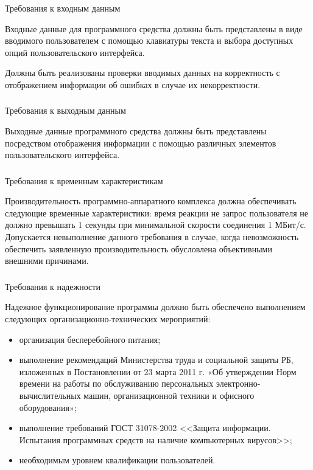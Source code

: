 \subsubsection{} Требования к входным данным
\label{sec:analysis:specification:inputs}

Входные данные для программного средства должны быть представлены в виде вводимого пользователем с помощью клавиатуры текста и выбора доступных опций пользовательского интерфейса.

Должны быть реализованы проверки вводимых данных на корректность с отображением информации об ошибках в случае их некорректности.

\subsubsection{} Требования к выходным данным
\label{sec:analysis:specification:outputs}

Выходные данные программного средства должны быть представлены посредством отображения информации с помощью различных элементов пользовательского интерфейса.

\subsubsection{} Требования к временным характеристикам
\label{sec:analysis:specification:timing}

Производительность программно-аппаратного комплекса должна обеспечивать следующие временные характеристики: время реакции не запрос пользователя не должно превышать 1 секунды при минимальной скорости соединения 1 МБит/с. Допускается невыполнение данного требования в случае, когда невозможность обеспечить заявленную производительность обусловлена объективными внешними причинами.

\subsubsection{} Требования к надежности
\label{sec:analysis:specification:reliability}

Надежное функционирование программы должно быть обеспечено выполнением следующих организационно-технических мероприятий:

\begin{itemize}
	\item организация бесперебойного питания;
	\item выполнение рекомендаций Министерства труда и социальной защиты РБ, изложенных в Постановлении от 23 марта 2011 г. «Об утверждении Норм времени на работы по обслуживанию персональных электронно-вычислитель\-ных машин, организационной техники и офисного оборудования»;
	\item выполнение требований ГОСТ 31078-2002 <<Защита информации. Испытания программных средств на наличие компьютерных вирусов>>;
	\item необходимым уровнем квалификации пользователей.
\end{itemize}

